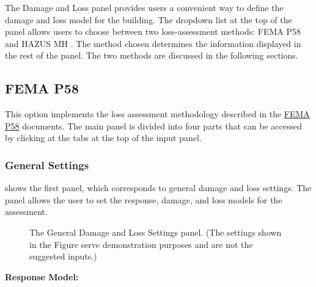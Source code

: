 The Damage and Loss panel provides users a convenient way to define the damage and loss model for the building. The dropdown list at the top of the panel allows users to choose between two loss-assessment methods: FEMA P58 \cite{applied_technology_council_atc_fema_2012} and HAZUS MH \cite{federal_emergency_management_agency_fema_hazus_2018-2}. The method chosen determines the information displayed in the rest of the panel. The two methods are discussed in the following sections.

\subsection{FEMA P58}

This option implements the loss assessment methodology described in the \href{https://www.fema.gov/media-library/assets/documents/90380}{FEMA P58} documents. The main panel is divided into four parts that can be accessed by clicking at the tabs at the top of the input panel.

\subsubsection{General Settings}

 shows the first panel, which corresponds to general damage and loss settings. The panel allows the user to set the response, damage, and loss models for the assessment.

\begin{figure}[!htbp]
  \caption{The General Damage and Loss Settings panel. (The settings shown in the Figure serve demonstration purposes and are not the suggested inputs.)}
  \label{fig:dl_p58_general}
\end{figure}

\textbf{Response Model:}

